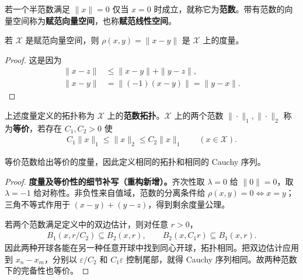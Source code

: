 \documentclass[../../main.tex]{subfiles}
\begin{document}
\begin{definition}[范数与赋范向量空间]\label{definition:ch05-norm}
若一个半范数满足 $\|x\|=0$ 仅当 $x=0$ 时成立，就称它为\textbf{范数}。带有范数的向量空间称为\textbf{赋范向量空间}，也称\textbf{赋范线性空间}。
\end{definition}
\begin{proposition}\label{proposition:ch05-norm-metric}
若 $\mathcal X$ 是赋范向量空间，则 $\rho(x,y)=\|x-y\|$ 是 $\mathcal X$ 上的度量。
\end{proposition}
\begin{proof}
这是因为
\begin{align*}
\|x-z\|&\le\|x-y\|+\|y-z\|,\\
\|x-y\|&=\|(-1)(x-y)\|=\|y-x\|.
\end{align*}
\end{proof}
\begin{definition}[范数拓扑与等价范数]\label{definition:ch05-equivalent-norms}
上述度量定义的拓扑称为 $\mathcal X$ 上的\textbf{范数拓扑}。$\mathcal X$ 上的两个范数 $\|\cdot\|_1,\|\cdot\|_2$ 称为\textbf{等价}，若存在 $C_1,C_2>0$ 使
\begin{align*}
C_1\|x\|_1\le\|x\|_2\le C_2\|x\|_1\qquad(x\in\mathcal X).
\end{align*}
\end{definition}
等价范数给出等价的度量，因此定义相同的拓扑和相同的 Cauchy 序列。
\begin{proof}
\textbf{度量及等价性的细节补写（重构新增）。}齐次性取 $\lambda=0$ 给 $\|0\|=0$，取 $\lambda=-1$ 给对称性。非负性来自值域，范数的分离条件给 $\rho(x,y)=0\Longleftrightarrow x=y$；三角不等式作用于 $(x-y)+(y-z)$，得到剩余度量公理。

若两个范数满足定义中的双边估计，则对任意 $r>0$，
\begin{align*}
B_1(x,r/C_2)\subseteq B_2(x,r),\qquad B_2(x,C_1r)\subseteq B_1(x,r).
\end{align*}
因此两种开球各能在另一种任意开球中找到同心开球，拓扑相同。把双边估计应用到 $x_n-x_m$，分别以 $\varepsilon/C_2$ 和 $C_1\varepsilon$ 控制尾部，就得 Cauchy 序列相同。故两种范数下的完备性也等价。
\end{proof}
\end{document}
